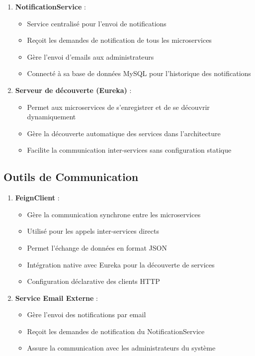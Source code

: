 \begin{enumerate}[label=\alph*)]
    \item \textbf{NotificationService} :
    \begin{itemize}[label=\textbullet]
        \item Service centralisé pour l'envoi de notifications
        \item Reçoit les demandes de notification de tous les microservices
        \item Gère l'envoi d'emails aux administrateurs
        \item Connecté à sa base de données MySQL pour l'historique des notifications
    \end{itemize}

    \item \textbf{Serveur de découverte (Eureka)} :
    \begin{itemize}[label=\textbullet]
        \item Permet aux microservices de s'enregistrer et de se découvrir dynamiquement
        \item Gère la découverte automatique des services dans l'architecture
        \item Facilite la communication inter-services sans configuration statique
    \end{itemize}
\end{enumerate}

\subsection{Outils de Communication}

\begin{enumerate}[label=\alph*)]
    \item \textbf{FeignClient} :
    \begin{itemize}[label=\textbullet]
        \item Gère la communication synchrone entre les microservices
        \item Utilisé pour les appels inter-services directs
        \item Permet l'échange de données en format JSON
        \item Intégration native avec Eureka pour la découverte de services
        \item Configuration déclarative des clients HTTP
    \end{itemize}

    \item \textbf{Service Email Externe} :
    \begin{itemize}[label=\textbullet]
        \item Gère l'envoi des notifications par email
        \item Reçoit les demandes de notification du NotificationService
        \item Assure la communication avec les administrateurs du système
    \end{itemize}
\end{enumerate}

